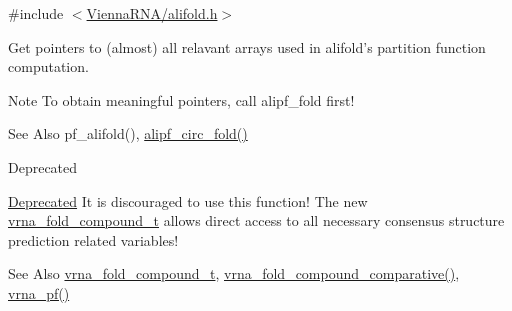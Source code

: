 {\ttfamily \#include $<$\hyperlink{alifold_8h}{Vienna\-R\-N\-A/alifold.\-h}$>$}



Get pointers to (almost) all relavant arrays used in alifold's partition function computation. 

\begin{DoxyNote}{Note}
To obtain meaningful pointers, call alipf\-\_\-fold first!
\end{DoxyNote}
\begin{DoxySeeAlso}{See Also}
pf\-\_\-alifold(), \hyperlink{group__consensus__pf__fold_gaadd8d570442f86cbbc4978c8c62c9646}{alipf\-\_\-circ\-\_\-fold()}
\end{DoxySeeAlso}
\begin{DoxyRefDesc}{Deprecated}
\item[\hyperlink{deprecated__deprecated000024}{Deprecated}]It is discouraged to use this function! The new \hyperlink{group__fold__compound_ga1b0cef17fd40466cef5968eaeeff6166}{vrna\-\_\-fold\-\_\-compound\-\_\-t} allows direct access to all necessary consensus structure prediction related variables!\end{DoxyRefDesc}


\begin{DoxySeeAlso}{See Also}
\hyperlink{group__fold__compound_ga1b0cef17fd40466cef5968eaeeff6166}{vrna\-\_\-fold\-\_\-compound\-\_\-t}, \hyperlink{group__fold__compound_gad6bacc816af274922b13d947f708aa0c}{vrna\-\_\-fold\-\_\-compound\-\_\-comparative()}, \hyperlink{group__pf__fold_ga29e256d688ad221b78d37f427e0e99bc}{vrna\-\_\-pf()}
\end{DoxySeeAlso}

